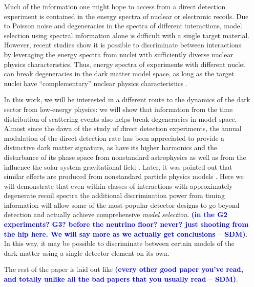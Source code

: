 \documentclass[11pt]{article}
\newcommand{\sdm}[1]{\textcolor{blue}{\textbf{(#1 -- SDM)}}}
\begin{document}
Much of the information one might hope to access from a direct detection experiment is contained in the energy spectra of nuclear or electronic recoils. Due to Poisson noise and degeneracies in the spectra of different interactions, model selection using spectral information alone is difficult with a single target material. However, recent studies show it is possible to discriminate between interactions by leveraging the energy spectra from nuclei with sufficiently diverse nuclear physics characteristics. Thus, energy spectra of experiments with different nuclei can break degeneracies in the dark matter model space, as long as the target nuclei have ``complementary'' nuclear physics characteristics \cite{McDermott:2011hx,Peter:2013aha,Gluscevic:2014vga,Catena:2014epa,Catena:2014hla,Dent:2015zpa,Gluscevic:2015sqa}.

In this work, we will be interested in a different route to the dynamics of the dark sector from low-energy physics: we will show that information from the time distribution of scattering events also helps break degeneracies in model space. Almost since the dawn of the study of direct detection experiments, the annual modulation of the direct detection rate \cite{Freese:1987wu} has been appreciated to provide a distinctive dark matter signature, as have its higher harmonics \cite{Freese:2012xd,Lee:2013xxa} and the disturbance of its phase space from nonstandard astrophysics \cite{Green:2000ga,Gelmini:2000dm} as well as from the influence the solar system gravitational field \cite{Lee:2013wza,DelNobile:2015tza,DelNobile:2015nua,DelNobile:2015rmp}. Later, it was pointed out that similar effects are produced from nonstandard particle physics models \cite{DelNobile:2015tza}. Here we will demonstrate that even within classes of interactions with approximately degenerate recoil spectra the additional discrimination power from timing information will allow some of the most popular detector designs to go beyond detection and actually achieve comprehensive {\it model selection}. \sdm{in the G2 experiments? G3? before the neutrino floor? never? just shooting from the hip here. We will say more as we actually get conclusions}. In this way, it may be possible to discriminate between certain models of the dark matter using a single detector element on its own.

The rest of the paper is laid out like \sdm{every other good paper you've read, and totally unlike all the bad papers that you usually read}.
\end{document}
